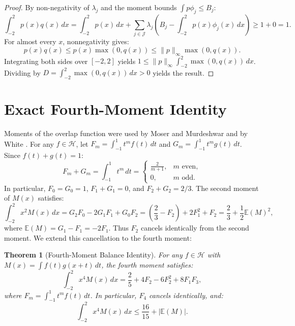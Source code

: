 \documentclass[11pt,a4paper]{article}
\newtheorem{theorem}{Theorem}[section]
\theoremstyle{definition}
\theoremstyle{remark}
\newcommand{\E}{\mathbb{E}}
\begin{document}
\begin{proof}
By non-negativity of $\lambda_j$ and the moment bounds $\int p \phi_j \le B_j$:
\begin{equation}
\int_{-2}^2 p(x) q(x) \, dx = \int_{-2}^2 p(x) \, dx + \sum_{j \in \mathcal{J}} \lambda_j \left( B_j - \int_{-2}^2 p(x) \phi_j(x) \, dx \right) \ge 1 + 0 = 1.
\end{equation}
For almost every $x$, nonnegativity gives:
\begin{equation}
p(x) q(x) \le p(x) \max(0, q(x)) \le \|p\|_\infty \max(0, q(x)).
\end{equation}
Integrating both sides over $[-2, 2]$ yields $1 \le \|p\|_\infty \int_{-2}^2 \max(0, q(x)) \, dx$. Dividing by $D = \int_{-2}^2 \max(0, q(x)) \, dx > 0$ yields the result.
\end{proof}

\section{Exact Fourth-Moment Identity}
\label{sec:fourth}

Moments of the overlap function were used by Moser and Murdeshwar \cite{mosermurdeshwar1966} and by White \cite{white2022}. For any $f \in \mathcal{H}$, let $F_m = \int_{-1}^1 t^m f(t) \, dt$ and $G_m = \int_{-1}^1 t^m g(t) \, dt$. Since $f(t) + g(t) = 1$:
\begin{equation}
F_m + G_m = \int_{-1}^1 t^m \, dt = \begin{cases} \frac{2}{m+1}, & m \text{ even}, \\ 0, & m \text{ odd}. \end{cases}
\end{equation}
In particular, $F_0 = G_0 = 1$, $F_1 + G_1 = 0$, and $F_2 + G_2 = 2/3$. The second moment of $M(x)$ satisfies:
\begin{equation}
\int_{-2}^2 x^2 M(x) \, dx = G_2 F_0 - 2G_1F_1 + G_0F_2 = \left(\frac{2}{3} - F_2\right) + 2F_1^2 + F_2 = \frac{2}{3} + \frac{1}{2}\E(M)^2,
\end{equation}
where $\E(M) = G_1 - F_1 = -2F_1$. Thus $F_2$ cancels identically from the second moment. We extend this cancellation to the fourth moment:

\begin{theorem}[Fourth-Moment Balance Identity]
\label{thm:fourth_moment}
For any $f \in \mathcal{H}$ with $M(x) = \int f(t)g(x+t) \, dt$, the fourth moment satisfies:
\begin{equation}
\int_{-2}^2 x^4 M(x) \, dx = \frac{2}{5} + 4F_2 - 6F_2^2 + 8F_1F_3,
\end{equation}
where $F_m = \int_{-1}^1 t^m f(t) \, dt$. In particular, $F_4$ cancels identically, and:
\begin{equation}
\int_{-2}^2 x^4 M(x) \, dx \le \frac{16}{15} + |\E(M)|.
\end{equation}
\end{theorem}
\end{document}
